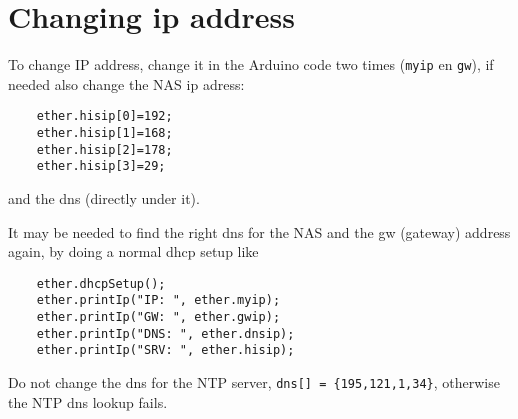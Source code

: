 \section{Changing ip address}


To change IP address, change it in the Arduino code two times (\verb|myip| en \verb|gw|), if needed also change the NAS ip adress:
\begin{lstlisting}
    ether.hisip[0]=192;
    ether.hisip[1]=168;
    ether.hisip[2]=178;
    ether.hisip[3]=29;
\end{lstlisting}
and the dns (directly under it).

It may be needed to find the right dns for the NAS and the gw (gateway) address again, by doing a normal dhcp setup like
\begin{lstlisting}
    ether.dhcpSetup();
    ether.printIp("IP: ", ether.myip);
    ether.printIp("GW: ", ether.gwip);
    ether.printIp("DNS: ", ether.dnsip);
    ether.printIp("SRV: ", ether.hisip);
\end{lstlisting}
Do not change the dns for the NTP server, \verb|dns[] = {195,121,1,34}|, otherwise the NTP dns lookup fails.